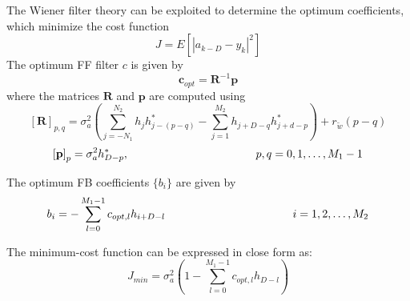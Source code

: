 \documentclass[a4paper, 12pt]{report}
\begin{document}
The Wiener filter theory can be exploited to determine the optimum coefficients, which minimize the cost function
\begin{equation}
J = E \left[|a_{k-D}-y_k|^2\right]
\end{equation}
The optimum FF filter $c$ is given by
\begin{equation}\label{c}
\mathbf{c}_{opt} = \mathbf{R}^{-1}\mathbf{p}
\end{equation}
where the matrices $\mathbf{R}$ and $\mathbf{p}$ are computed using
\begin{equation}
\mathbf{[R]}_{p,q} = \sigma_a^2 \left( \sum_{j=-N_1}^{N_2}h_jh^*_{j-(p-q)}-\sum_{j=1}^{M_2}h_{j+D-q}h^*_{j+d-p} \right) + r_{\tilde{w}}(p-q)
\end{equation}
\begin{equation}
\mathbf{[p]}_p = \sigma_a^2 h^*_{D-p}, \hspace*{4cm} p,q = 0,1,\dots,M_1-1
\end{equation}

The optimum FB coefficients $\{b_i\}$ are given by
\begin{equation}
b_i = -\sum_{l=0}^{M_1-1}c_{opt,l}h_{i+D-l} \hspace*{4cm} i =1,2,\dots,M_2
\end{equation}

The minimum-cost function can be expressed in close form as:
\begin{equation}\label{jmincf}
J_{min} = \sigma^2_a \left( 1-\sum_{l=0}^{M_1-1} c_{opt,l}h_{D-l}\right)
\end{equation}
\end{document}
